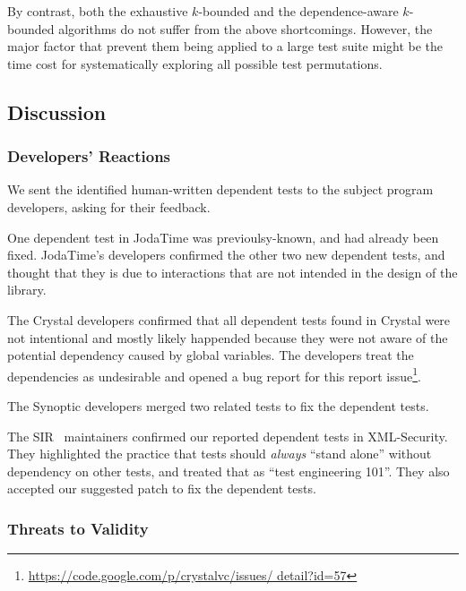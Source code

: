 By contrast, both the exhaustive $k$-bounded and the dependence-aware
$k$-bounded algorithms do not suffer from the above shortcomings.
However, the major factor that prevent them being applied to a
large test suite might be the time cost for systematically
exploring all possible test permutations.





\subsection{Discussion}
\label{sec:expdiscussion}

\subsubsection{Developers' Reactions}

We sent the identified human-written dependent tests to the
subject program developers, asking for their feedback.

One dependent test in JodaTime was previoulsy-known,
and had already been fixed. JodaTime's
developers confirmed the other two new dependent
tests, and thought that they is due to interactions
that are not intended in the design of the library.

The Crystal developers confirmed that all dependent tests
found in Crystal were not intentional and mostly likely
happended because they were not aware of the potential dependency
caused by global variables. The developers treat the
dependencies as undesirable and opened a bug report for
this report issue\footnote{\url{https://code.google.com/p/crystalvc/issues/ detail?id=57}}.

The Synoptic developers merged two related tests to fix
the dependent tests.

The SIR~\cite{sir} maintainers confirmed our reported dependent
tests in XML-Security. They highlighted the practice
that tests should \textit{always} ``stand alone''
without dependency on other tests, and treated that as
``test engineering 101''. They also accepted our suggested
patch to fix the dependent tests.

\subsubsection{Threats to Validity}

